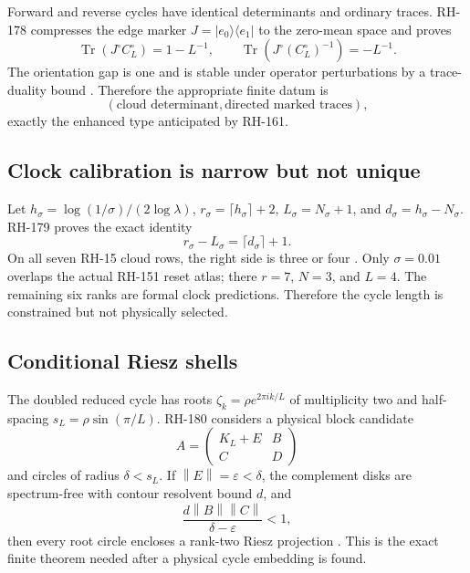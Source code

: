 \documentclass[12pt]{article}
\theoremstyle{remark}
\newcommand{\Tr}{\operatorname{Tr}}
\newcommand{\norm}[1]{\left\lVert#1\right\rVert}
\begin{document}
Forward and reverse cycles have identical determinants and ordinary traces.
RH-178 compresses the edge marker $J=|e_0\rangle\langle e_1|$ to the
zero-mean space and proves
\begin{equation}\label{eq:orientation}
 \Tr(J^\circ C_L^\circ)=1-L^{-1},
 \qquad
 \Tr(J^\circ(C_L^\circ)^{-1})=-L^{-1}.
\end{equation}
The orientation gap is one and is stable under operator perturbations by a
trace-duality bound \citep{WangRH178}.  Therefore the appropriate finite datum
is
\[
 (\text{cloud determinant},\text{directed marked traces}),
\]
exactly the enhanced type anticipated by RH-161.

\subsection{Clock calibration is narrow but not unique}

Let
$h_\sigma=\log(1/\sigma)/(2\log\lambda)$,
$r_\sigma=\lceil h_\sigma\rceil+2$,
$L_\sigma=N_\sigma+1$, and
$d_\sigma=h_\sigma-N_\sigma$.  RH-179 proves the exact identity
\begin{equation}\label{eq:clock}
 r_\sigma-L_\sigma=\lceil d_\sigma\rceil+1.
\end{equation}
On all seven RH-15 cloud rows, the right side is three or four
\citep{WangRH179}.  Only $\sigma=0.01$ overlaps the actual RH-151 reset atlas;
there $r=7$, $N=3$, and $L=4$.  The remaining six ranks are formal clock
predictions.  Therefore the cycle length is constrained but not physically
selected.

\subsection{Conditional Riesz shells}

The doubled reduced cycle has roots
$\zeta_k=\rho e^{2\pi ik/L}$ of multiplicity two and half-spacing
$s_L=\rho\sin(\pi/L)$.  RH-180 considers a physical block candidate
\[
 A=\begin{pmatrix}K_L+E&B\\C&D\end{pmatrix}
\]
and circles of radius $\delta<s_L$.  If $\norm E=\varepsilon<\delta$, the
complement disks are spectrum-free with contour resolvent bound $d$, and
\begin{equation}\label{eq:cyclic-schur}
 \frac{d\norm B\norm C}{\delta-\varepsilon}<1,
\end{equation}
then every root circle encloses a rank-two Riesz projection
\citep{WangRH180}.  This is the exact finite theorem needed after a physical
cycle embedding is found.
\end{document}
